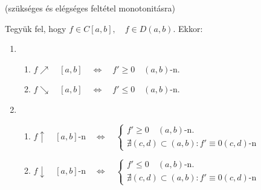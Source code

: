 \documentclass[a4paper,11.5pt]{article}
\begin{document}
	\begin{theorem}
		(szükséges és elégséges feltétel monotonitásra)
		
		Tegyük fel, hogy $f\in C[a,b], \quad f\in D(a,b).$ Ekkor:
		\begin{enumerate}
			\item \begin{enumerate}
				\item $f\nearrow \quad [a,b]\quad \Leftrightarrow\quad f'\geq0\quad (a,b)$-n.
				\item $f\searrow \quad [a,b]\quad \Leftrightarrow\quad f'\leq0\quad (a,b)$-n.
			\end{enumerate}
			\item \begin{enumerate}
				\item $f\uparrow \quad [a,b]$-n$\quad \Leftrightarrow\quad \left\{\begin{gathered}
				f'\geq0\quad (a,b)\text{-n.}\\
				\nexists (c,d)\subset(a,b): f'\equiv0 (c,d)\text{-n}
				\end{gathered}\right.$
				\medskip
				
				\item $f\downarrow \quad [a,b]$-n$\quad \Leftrightarrow\quad \left\{\begin{gathered}
				f'\leq0\quad (a,b)\text{-n.}\\
				\nexists (c,d)\subset(a,b): f'\equiv0 (c,d)\text{-n}
				\end{gathered}\right.$
			\end{enumerate}
		\end{enumerate}
	\end{theorem}
\end{document}
